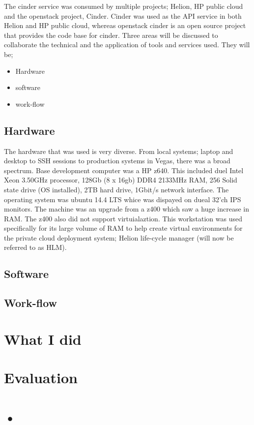 \documentclass[11pt,a4paper]{report}
\begin{document}
The cinder service was consumed by multiple projects; Helion, HP public cloud and the openstack project, Cinder. Cinder was used as the API service in both Helion and HP public cloud, whereas openstack cinder is an open source project that provides the code base for cinder. Three areas will be discussed to collaborate the technical and the application of tools and services used. They will be;

\begin{itemize}
\item Hardware
\item software
\item work-flow
\end{itemize} 

\subsection{Hardware}
The hardware that was used is very diverse. From local systems; laptop and desktop to SSH sessions to production systems in Vegas, there was a broad spectrum.
Base development computer was a HP z640. This included duel Intel Xeon 3.50GHz processor, 128Gb (8 x 16gb) DDR4 2133MHz RAM, 256 Solid state drive (OS installed), 2TB hard drive, 1Gbit/s network interface. The operating system was ubuntu 14.4 LTS whice was dispayed on dueal 32'ch IPS monitors. The machine was an upgrade from a z400 which saw a huge increase in RAM. The z400 also did not support virtuialaztion. This workstation was used specifically for its large volume of RAM to help create virtual environments for the private cloud deployment system; Helion life-cycle manager (will now be referred to as HLM).

\subsection{Software}

\subsection{Work-flow}


\section{What I did}



\section{Evaluation}



\section{•}
\end{document}
